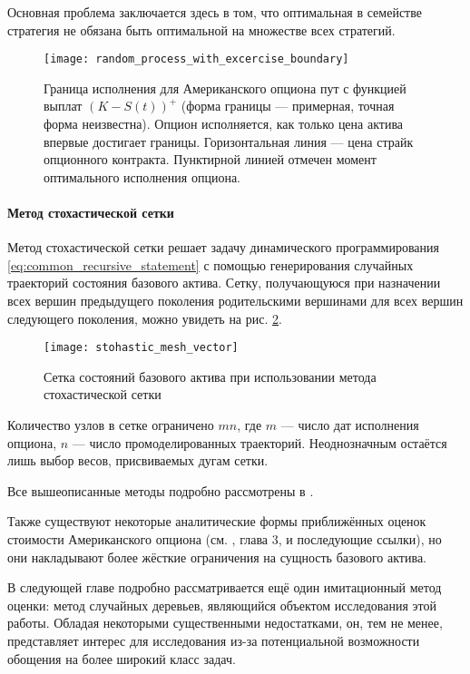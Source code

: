 Основная проблема заключается здесь в том, что оптимальная в семействе стратегия не обязана быть оптимальной на множестве всех стратегий.
\begin{figure}[htb]
\centering
\texttt{[image: random\_process\_with\_excercise\_boundary]}
\caption{Граница исполнения для Американского опциона пут с функцией выплат $\left(K-S(t)\right)^+$ (форма границы --- примерная, точная форма неизвестна). Опцион исполняется, как только цена актива впервые достигает границы. Горизонтальная линия --- цена страйк опционного контракта. Пунктирной линией отмечен момент оптимального исполнения опциона.}
\label{fig:excercise_boundary}
\end{figure}

\paragraph{Метод стохастической сетки}
Метод стохастической сетки решает задачу динамического программирования \eqref{eq:common_recursive_statement} с помощью генерирования случайных траекторий состояния базового актива. Сетку, получающуюся при назначении всех вершин предыдущего поколения родительскими вершинами для всех вершин следующего поколения, можно увидеть на рис. \ref{fig:stohastic_mesh}.
\begin{figure}[htpb]
\centering
\texttt{[image: stohastic\_mesh\_vector]}
\caption{Сетка состояний базового актива при использовании метода стохастической сетки}
\label{fig:stohastic_mesh}
\end{figure}

Количество узлов в сетке ограничено $mn$, где $m$ ---  число дат исполнения опциона, $n$ --- число промоделированных траекторий. Неоднозначным остаётся лишь выбор весов, присвиваемых дугам сетки.

Все вышеописанные методы подробно рассмотрены в \cite{Glasserman2004}.

Также существуют некоторые аналитические формы приближённых оценок стоимости Американского опциона (см. \cite{Haug2007}, глава 3, и последующие ссылки), но они накладывают более жёсткие ограничения на сущность базового актива.

В следующей главе подробно рассматривается ещё один имитационный метод оценки: метод случайных деревьев, являющийся объектом исследования этой работы. Обладая некоторыми существенными недостатками, он, тем не менее, представляет интерес для исследования из-за потенциальной возможности обощения на более широкий класс задач.
